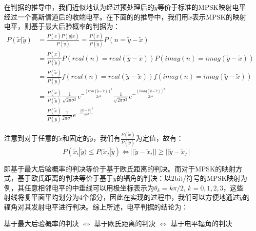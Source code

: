 在判据的推导中，我们近似地认为经过预处理后的$\tilde{y}$等价于标准的MPSK映射电平经过一个高斯信道后的收端电平。在下面的的推导中，我们用$\tilde{x}$表示MPSK的映射电平，则基于最大后验概率的判据为：
\begin{equation*}
\begin{aligned}
    P(\tilde{x}|\tilde{y})
    &=\frac{P(\tilde{x})P(\tilde{y}|\tilde{x})}{P(\tilde{y})}
    =\frac{P(\tilde{x})}{P(\tilde{y})}P(n=\tilde{y}-\tilde{x})\\
    &=\frac{P(\tilde{x})}{P(\tilde{y})}
    P(real(n)=real(\tilde{y}-\tilde{x}))
    P(imag(n)=imag(\tilde{y}-\tilde{x}))\\
    &=\frac{P(\tilde{x})}{P(\tilde{y})}
    f(real(n)=real(\tilde{y}-\tilde{x}))
    f(imag(n)=imag(\tilde{y}-\tilde{x}))\\
    &=\frac{P(\tilde{x})}{P(\tilde{y})}
    \frac{1}{\sqrt{2\pi\sigma^2}}
    e^{-\frac{(real(\tilde{y}-\tilde{x}))^2}{2\sigma^2}}
    \frac{1}{\sqrt{2\pi\sigma^2}}
    e^{-\frac{(imag(\tilde{y}-\tilde{x}))^2}{2\sigma^2}}\\
    &=\frac{P(\tilde{x})}{P(\tilde{y})}
    \frac{1}{2\pi\sigma^2}
    e^{-\frac{||\tilde{y}-\tilde{x}||^2}{2\sigma^2}}
\end{aligned}
\end{equation*}

注意到对于任意的$\tilde{x}$和固定的$\tilde{y}$，我们有$\frac{P(\tilde{x})}{P(\tilde{y})}$为定值，故有：
$$P(\tilde{x}_i|\tilde{y})\leq P(\tilde{x}_j|\tilde{y})\Leftrightarrow ||\tilde{y}-\tilde{x}_i||\geq||\tilde{y}-\tilde{x}_j||$$

即基于最大后验概率的判决等价于基于欧氏距离的判决。而对于MPSK的映射方式，基于欧氏距离的判决等价于基于$\tilde{y}$的辐角的判决：以2bit/符号的MPSK映射为例，其任意相邻电平的中垂线可以用极坐标表示为$\theta_k=k\pi/2,\,k=0,1,2,3$，这些射线将复平面平均划分为4个部分，因此在实现的过程中，我们可以方便地通过$\tilde{y}$的辐角对其发射电平进行判决。综上所述，电平判据的结论为：

\begin{center}
    基于最大后验概率的判决 $\Leftrightarrow$ 基于欧氏距离的判决 $\Leftrightarrow$ 基于电平辐角的判决 
\end{center}

